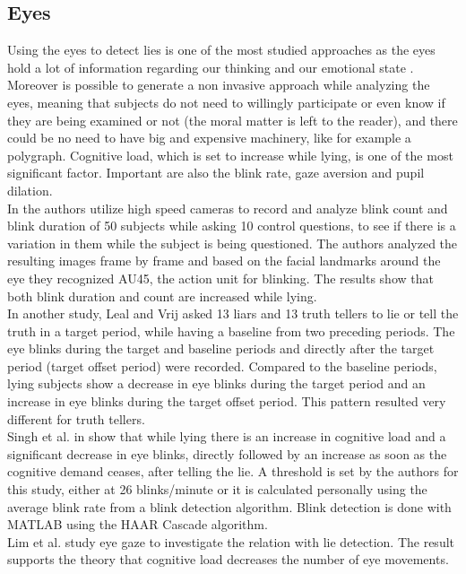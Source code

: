 \subsection*{Eyes}
Using the eyes to detect lies is one of the most studied approaches as the eyes hold a lot of information regarding our thinking and our emotional state \cite{FUKUDA2001239}. Moreover is possible to generate a non invasive approach while analyzing the eyes, meaning that subjects do not need to willingly participate or even know if they are being examined or not (the moral matter is left to the reader), and there could be no need to have big and expensive machinery, like for example a polygraph. Cognitive load, which is set to increase while lying, is one of the most significant factor. Important are also the blink rate, gaze aversion and pupil dilation.\\
In \cite{8125844} the authors utilize high speed cameras to record and analyze blink count and blink duration of 50 subjects while asking 10 control questions, to see if there is a variation in them while the subject is being questioned. The authors analyzed the resulting images frame by frame and based on the facial landmarks around the eye they recognized AU45, the action unit for blinking. The results show that both blink duration and count are increased while lying.\\
In another study, Leal and Vrij \cite{Leal2008} asked 13 liars and 13 truth tellers to lie or tell the truth in a target period, while having a baseline from two preceding periods. The eye blinks during the target and baseline periods and directly after the target period (target offset period) were recorded. Compared to the baseline periods, lying subjects show a decrease in eye blinks during the target period and an increase in eye blinks during the target offset period. This pattern resulted very different for truth tellers. \\
Singh et al. in \cite{7324092} show that while lying there is an increase in cognitive load and a significant decrease in eye blinks, directly followed by an increase as soon as the cognitive demand ceases, after telling the lie. A threshold is set by the authors for this study, either at 26 blinks/minute or it is calculated personally using the average blink rate from a blink detection algorithm. Blink detection is done with MATLAB using the HAAR Cascade algorithm. \\
Lim et al. study eye gaze \cite{Lim:2013:LTE:2535948.2535954} to investigate the relation with lie detection. The result supports the theory that cognitive load decreases the number of eye movements.\\
